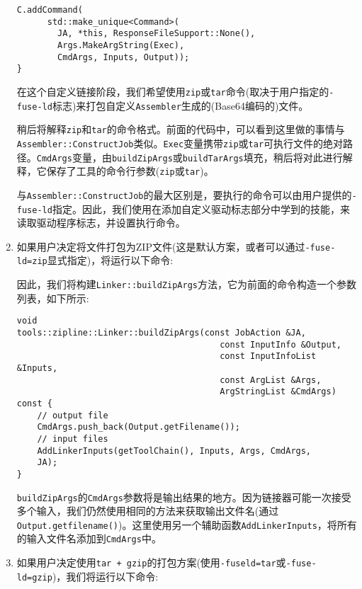 \begin{enumerate}
\begin{lstlisting}[style=styleCXX]
	C.addCommand(
	  std::make_unique<Command>(
	    JA, *this, ResponseFileSupport::None(),
	    Args.MakeArgString(Exec),
	    CmdArgs, Inputs, Output));
}
\end{lstlisting}

在这个自定义链接阶段，我们希望使用\texttt{zip}或\texttt{tar}命令(取决于用户指定的\texttt{-fuse-ld}标志)来打包自定义\texttt{Assembler}生成的(Base64编码的)文件。

稍后将解释\texttt{zip}和\texttt{tar}的命令格式。前面的代码中，可以看到这里做的事情与\texttt{Assembler::ConstructJob}类似。\texttt{Exec}变量携带\texttt{zip}或\texttt{tar}可执行文件的绝对路径。\texttt{CmdArgs}变量，由\texttt{buildZipArgs}或\texttt{buildTarArgs}填充，稍后将对此进行解释，它保存了工具的命令行参数(\texttt{zip}或\texttt{tar})。

与\texttt{Assembler::ConstructJob}的最大区别是，要执行的命令可以由用户提供的\texttt{-fuse-ld}指定。因此，我们使用在添加自定义驱动标志部分中学到的技能，来读取驱动程序标志，并设置执行命令。

\item 如果用户决定将文件打包为ZIP文件(这是默认方案，或者可以通过\texttt{-fuse-ld=zip}显式指定)，将运行以下命令:


因此，我们将构建\texttt{Linker::buildZipArgs}方法，它为前面的命令构造一个参数列表，如下所示:

\begin{lstlisting}[style=styleCXX]
void
tools::zipline::Linker::buildZipArgs(const JobAction &JA,
										const InputInfo &Output,
										const InputInfoList &Inputs,
										const ArgList &Args,
										ArgStringList &CmdArgs) const {
	// output file
	CmdArgs.push_back(Output.getFilename());
	// input files
	AddLinkerInputs(getToolChain(), Inputs, Args, CmdArgs,
	JA);
}
\end{lstlisting}

\texttt{buildZipArgs}的\texttt{CmdArgs}参数将是输出结果的地方。因为链接器可能一次接受多个输入，我们仍然使用相同的方法来获取输出文件名(通过\texttt{Output.getfilename()})。这里使用另一个辅助函数\texttt{AddLinkerInputs}，将所有的输入文件名添加到\texttt{CmdArgs}中。

\item 如果用户决定使用\texttt{tar + gzip}的打包方案(使用\texttt{-fuseld=tar}或\texttt{-fuse-ld=gzip})，我们将运行以下命令:


\end{enumerate}
